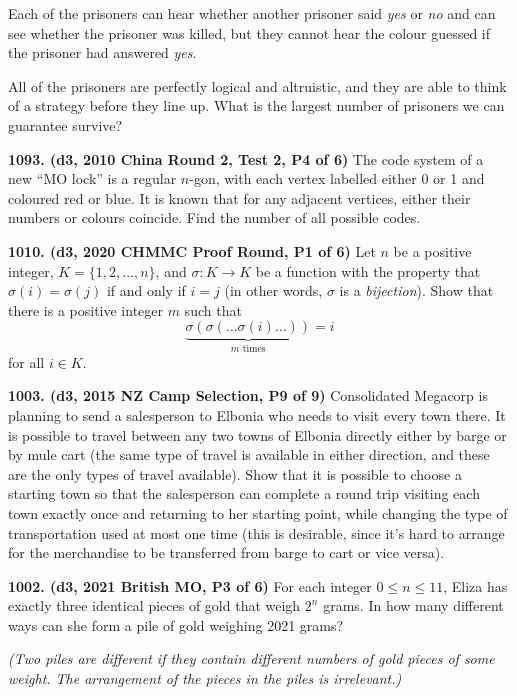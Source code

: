 \documentclass{article}
\begin{document}
        Each of the prisoners can hear whether another prisoner said \emph{yes} or \emph{no} and can see whether the prisoner was killed, but they cannot hear the colour guessed if the prisoner had answered \emph{yes}.

        All of the prisoners are perfectly logical and altruistic, and they are able to think of a strategy before they line up. What is the largest number of prisoners we can guarantee survive?


        \textbf{1093. (\color{red}d3\color{black}, 2010 China Round 2, Test 2, P4 of 6)} The code system of a new ``MO lock'' is a regular $n$-gon, with each vertex labelled either 0 or 1 and coloured red or blue. It is known that for any adjacent vertices, either their numbers or colours coincide. Find the number of all possible codes.

        \textbf{1010. (\color{red}d3\color{black}, 2020 CHMMC Proof Round, P1 of 6)} Let \(n\) be a positive integer, $K = \{1, 2, . . . , n\}$, and $\sigma : K \to K$ be a function with the property that $\sigma(i) = \sigma(j)$ if and only if $i = j$ (in other words, $\sigma$ is a \emph{bijection}). Show that there is a positive integer $m$ such that
        \[
                \underbrace{\sigma(\sigma(\ldots \sigma(i)\ldots))}_{m\text{ times}} = i
        \]
        for all $i \in K$.

        \textbf{1003. (\color{red}d3\color{black}, 2015 NZ Camp Selection, P9 of 9)} Consolidated Megacorp is planning to send a salesperson to Elbonia who needs to visit every town there. It is possible to travel between any two towns of Elbonia directly either by barge or by mule cart (the same type of travel is available in either direction, and these are the only types of travel available). Show that it is possible to choose a starting town so that the salesperson can complete a round trip visiting each town exactly once and returning to her starting point, while changing the type of transportation used at most one time (this is desirable, since it's hard to arrange for the merchandise to be transferred from barge to cart or vice versa).

        \textbf{1002. (\color{red}d3\color{black}, 2021 British MO, P3 of 6)} For each integer $0 \leq n \leq 11$, Eliza has exactly three identical pieces of gold that weigh $2^{n}$ grams. In how many different ways can she form a pile of gold weighing 2021 grams?

        \emph{(Two piles are different if they contain different numbers of gold pieces of some weight. The arrangement of the pieces in the piles is irrelevant.)}
\end{document}

